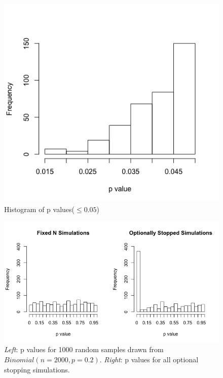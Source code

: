 \begin{figure}[h] 
\begin{center}
\includegraphics[scale=0.5]{freqstoppval.png}
	\caption{Histogram of p values($\leq 0.05$)}
	\label{fig:freqhistpval}
\end{center}	
\end{figure}

\begin{figure}[h] 
\begin{center}
\includegraphics[scale=0.6]{fixedvsoptional.png}
	\caption{\emph{Left}: p values for 1000 random samples drawn from $Binomial(n=2000,p=0.2)$. \emph{Right}: p values for all optional stopping simulations.}
	\label{fig:freqfixedvsoptional}
\end{center}	
\end{figure}

